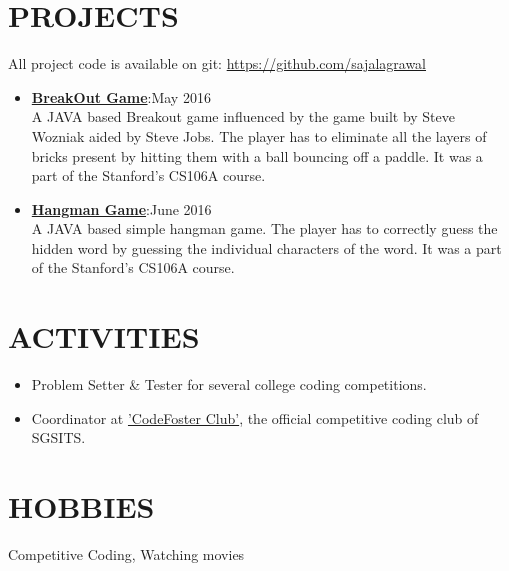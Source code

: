 \documentclass[line, margin]{res}
\begin{document}
\begin{resume}
\section{PROJECTS}
All project code is available on git: \href{https://github.com/sajalagrawal}{https://github.com/sajalagrawal}
\begin{itemize}
\item\textbf{\href{https://github.com/sajalagrawal/Breakout-Game}{BreakOut Game}}:\hfill May 2016\\ A JAVA based Breakout game influenced by the game built by Steve Wozniak aided by Steve Jobs. The player has to eliminate all the layers of bricks present by hitting them with a ball bouncing off a paddle. It was a part of the Stanford's CS106A course.
\item\textbf{\href{https://github.com/sajalagrawal/Hangman-Game}{Hangman Game}}:\hfill June 2016\\ A JAVA based simple hangman game. The player has to correctly guess the hidden word by guessing the individual characters of the word. It was a part of the Stanford's CS106A course.
\end{itemize}

\section{ACTIVITIES}
\begin{itemize}
\item Problem Setter \& Tester for several college coding competitions.
\item Coordinator at \href{http://codefoster.club/}{'CodeFoster Club'}, the official competitive coding club of SGSITS.
\end{itemize}

\section{HOBBIES}
Competitive Coding, Watching movies

\end{resume}
\end{document}
